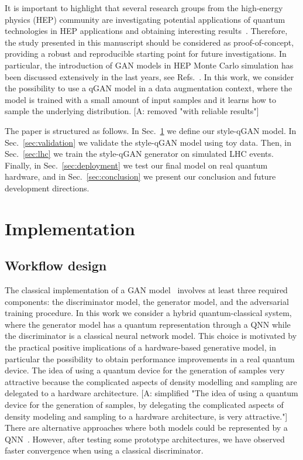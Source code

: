 \documentclass[twocolumn,preprintnumbers,superscriptaddress]{revtex4-2}
\newcommand{\commentAF}[1]{{\color{cyan} {[A: #1]}}}
\begin{document}
It is important to highlight that several research groups from the high-energy
physics (HEP) community are investigating potential applications of quantum
technologies in HEP applications and obtaining interesting
results~\cite{P_rez_Salinas_2021,Guan_2021,chang2021quantum,Chang_2021,Belis_2021,khattak2021fast}.
Therefore, the study presented in this manuscript should be considered as
proof-of-concept, providing a robust and reproducible starting point for future
investigations. In particular, the introduction of GAN models in HEP Monte Carlo
simulation has been discussed extensively in the last years, see
Refs.~\cite{baldi2021gan,Backes_2021,butter2020generative,Butter_2021,Butter_2020,Bellagente_2020,Butter_2019}.
In this work, we consider the possibility to use a qGAN model in a data
augmentation context, where the model is trained with a small amount of input
samples and it learns how to sample the underlying distribution. \commentAF{removed "with reliable
results"}

The paper is structured as follows. In Sec.~\ref{sec:implementation} we define our style-qGAN model. In Sec.~\ref{sec:validation} we
validate the style-qGAN model using toy data. Then, in Sec.~\ref{sec:lhc} we train the style-qGAN
generator on simulated LHC events. Finally, in Sec.~\ref{sec:deployment} we test
our final model on real quantum hardware, and in Sec.~\ref{sec:conclusion} we
present our conclusion and future development directions.

\section{Implementation}
\label{sec:implementation}

\subsection{Workflow design}

The classical implementation of a GAN model~\cite{goodfellow2014generative}
involves at least three required components: the discriminator model, the
generator model, and the adversarial training procedure. In this work we
consider a hybrid quantum-classical system, where the generator model has a
quantum representation through a QNN while the
discriminator is a classical neural network model. This choice is motivated by
the practical positive implications of a hardware-based generative model, in
particular the possibility to obtain performance improvements in a real quantum
device. The idea of using a quantum device for the generation of
samples very attractive because the complicated aspects of density modelling and sampling are delegated to a hardware architecture.
\commentAF{simplified "The idea of using a quantum device for the generation of
samples, by delegating the complicated aspects of density modeling and sampling
to a hardware architecture, is very attractive."}
%
There are alternative approaches where both models could be represented by a
QNN~\cite{dallaire2018quantum, hu2019quantum, benedetti2019adversarial, romero2021variational, niu2021entangling}. However, after testing some prototype architectures, we have observed faster convergence when using a classical discriminator.
\end{document}
